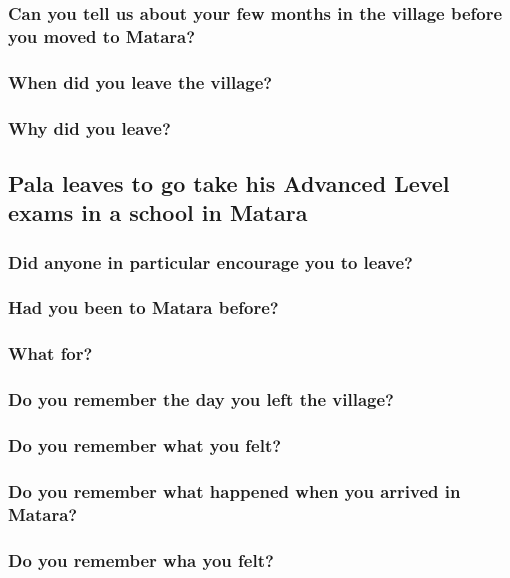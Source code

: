\documentclass[11pt]{article}
\begin{document}
\subsubsection{Can you tell us about your few months  in the village before you moved to Matara?}
\label{sec:orgeb7f06a}
\subsubsection{When did you leave the village?}
\label{sec:org6225d31}
\subsubsection{Why did you leave?}
\label{sec:orged39ead}

\subsection{Pala leaves to go take his Advanced Level exams in a school in Matara}
\label{sec:orga6e0e45}

\subsubsection{Did anyone in particular encourage you to leave?}
\label{sec:org3ad6e02}
\subsubsection{Had you been to Matara before?}
\label{sec:orge1fc32a}
\subsubsection{What for?}
\label{sec:org6f9d5ec}
\subsubsection{Do you remember the day you left the village?}
\label{sec:orgec8a310}
\subsubsection{Do you remember what you felt?}
\label{sec:org2a534cf}
\subsubsection{Do you remember what happened when you arrived in Matara?}
\label{sec:orge0c78f1}
\subsubsection{Do you remember wha you felt?}
\label{sec:orge602e2d}
\end{document}
